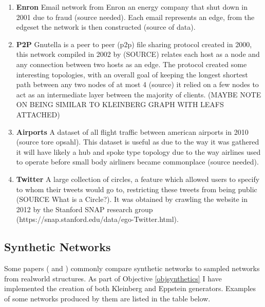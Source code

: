 \documentclass{article}
\begin{document}
\begin{enumerate}
	\item \textbf{Enron} Email network from Enron an energy company that shut down in 2001 due to fraud (source needed).
	      Each email represents an edge, from the edgeset the network is then constructed (source of data).
	\item \textbf{P2P} Gnutella is a peer to peer (p2p) file sharing protocol created in 2000,
	      this network compiled in 2002 by (SOURCE) relates each host as a node and any connection between two hosts as an edge.
	      The protocol created some interesting topologies, with an overall goal of keeping the longest shortest path between any two nodes of at most 4 (source) it relied on a few nodes to act as an intermediate layer between the majority of clients. (MAYBE NOTE ON BEING SIMILAR TO KLEINBERG GRAPH WITH LEAFS ATTACHED)
	\item \textbf{Airports} A dataset of all flight traffic between american airports in 2010 (source tore opsahl).
	      This dataset is useful as due to the way it was gathered it will have likely a hub and spoke type topology due to the way airlines used to operate before small body airliners became commonplace (source needed).
	\item \textbf{Twitter} A large collection of circles, a feature which allowed users to specify to whom their tweets would go to, restricting these tweets from being public (SOURCE What is a Circle?).
	      It was obtained by crawling the website in 2012 by the Stanford SNAP research group (https://snap.stanford.edu/data/ego-Twitter.html).
\end{enumerate}

\subsection{Synthetic Networks}
Some papers (\cite{franks2014learning} and \cite{}) commonly compare synthetic networks to sampled networks from realworld structures.
As part of Objective \ref{objsynthetics} I have implemented the creation of both Kleinberg and Eppstein generators.
Examples of some networks produced by them are listed in the table below.
\end{document}
